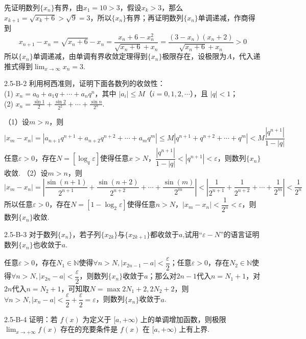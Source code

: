 \begin{solution}
    先证明数列$\{x_n\}$有界，由$x_1=10>3$，假设$x_k>3$，那么$x_{k+1}=\sqrt{x_k+6}>\sqrt9=3$，所以$\{x_n\}$有界；再证明数列$\{x_n\}$单调递减，作商得到
    \[x_{n+1}-x_n=\sqrt{x_n+6}-x_n=\dfrac{x_n+6-x_n^2}{\sqrt{x_n+6}+x_n}=\dfrac{(3-x_n)(x_n+2)}{\sqrt{x_n+6}+x_n}>0\]
    所以$\{x_n\}$单调递减，由单调有界收敛定理得到$\{x_n\}$极限存在，设极限为$A$，代入递推式得到$\displaystyle\lim_{x\to\infty}x_n=3$.
\end{solution}
\begin{example}{2.5-B-2}{}
    利用柯西准则，证明下面各数列的收敛性：\\
(1) $x_{n} = a_{0} + a_{1} q + \cdots + a_{n} q^{n}$，其中 $|a_{i}| \leqslant M$（$i = 0, 1, 2, \cdots$），且 $|q| < 1$；\\
(2) $x_{n} = \frac{\sin 1}{2} + \frac{\sin 2}{2^{2}} + \cdots + \frac{\sin n}{2^{n}}$.
\end{example}
\begin{solution}
    （1）设$m>n$，则
    \[|x_m-x_n|=|a_{n+1}q^{n+1}+a_{n+2}q^{n+2}+\cdots+a_{m}q^{m}| \leqslant M|q^{n+1}+q^{n+2}+\cdots+q^{m}|<M\dfrac{|q^{n+1}|}{1-|q|}\]
    任意$\varepsilon>0$，存在$N=[\log_{q}\varepsilon]$使得任意$x>N$，$\dfrac{|q^{n+1}|}{1-|q|}<|q^{n+1}|<\varepsilon$，则数列$\{x_n\}$收敛.
    （2）设$m>n$，则
    \[|x_m-x_n|=\left|\frac{\sin(n+1)}{2^{n+1}}+\frac{\sin(n+2)}{2^{n+2}}+\cdots+\frac{\sin(m)}{2^m}\right|<\left|\dfrac1{2^{n+1}}+\dfrac1{2^{n+2}}+\cdots+\dfrac1{2^m}\right|<\dfrac1{2^n}\]
    所以任意$\varepsilon>0$，存在$N=[1-\log_{2}\varepsilon]$使得任意$n>N$，$|x_m-x_n|<\dfrac1{2^n}<\varepsilon$，则数列$\{x_n\}$收敛.
\end{solution}
\begin{example}{2.5-B-3}{}
    对于数列$\{x_n\}$，若子列$\{x_{2k}\}$与$\{x_{2k+1}\}$都收敛于$a$,试用“$\varepsilon-N$”的语言证明数列$\{x_n\}$也收敛于$a$.
\end{example}
\begin{solution}
    任意$\varepsilon>0$，存在$N_1\in\mathbb{N}$使得$\forall n>N,|x_{2n-1}-a|<\dfrac{\varepsilon}{2}$；任意$\varepsilon>0$，存在$N_2\in\mathbb{N}$使得$\forall n>N,|x_{2n}-a|<\dfrac{\varepsilon}{2}$，则数列$\{x_n\}$收敛于$a$；那么对$2n-1$代入$n=N_1+1$，对$2n$代入$n=N_2+1$，可知取$N=\max{2N_1+2,2N_2+2}$，则$\forall n>N,|x_{n}-a|<\dfrac{\varepsilon}{2}+\dfrac{\varepsilon}2=\varepsilon$，则数列$\{x_n\}$收敛于$a$.
\end{solution}
\begin{example}{2.5-B-4}{}
    证明：若 $f(x)$ 为定义于 $[a, +\infty)$ 上的单调增加函数，则极限 $\lim_{x \to +\infty} f(x)$ 存在的充要条件是 $f(x)$ 在 $[a, +\infty)$ 上有上界.
\end{example}
